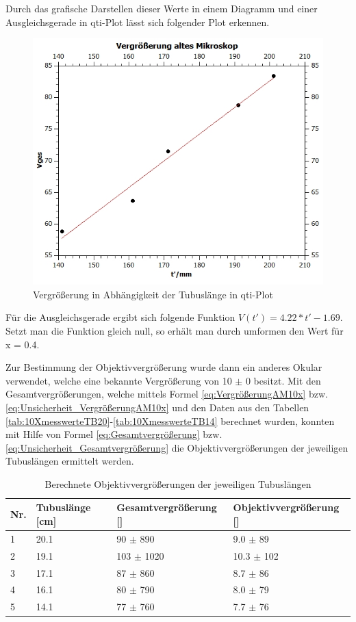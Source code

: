 \documentclass[12pt,a4paper,twoside]{article}
\begin{document}
\noindent
Durch das grafische Darstellen dieser Werte in einem Diagramm und einer Ausgleichsgerade in qti-Plot lässt sich folgender Plot erkennen.

\begin{figure}[H]
    \centering
    \includegraphics[width=0.6\linewidth, angle=0]{nudes/VergrößerungAltesMik.jpg}
    \caption{Vergrößerung in Abhängigkeit der Tubuslänge in qti-Plot}
    \label{fig:VergrößerungDiagramm}
\end{figure}

\noindent
Für die Ausgleichsgerade ergibt sich folgende Funktion $V(t') = 4.22*t' - 1.69$. Setzt man die Funktion gleich null, so erhält man durch umformen den Wert für x = 0.4. \newline

\noindent 
Zur Bestimmung der Objektivvergrößerung wurde dann ein anderes Okular verwendet, welche eine bekannte Vergrößerung von 10 $\pm$ 0 besitzt. 
Mit den Gesamtvergrößerungen, welche mittels Formel \ref{eq:VergrößerungAM10x} bzw. \ref{eq:Unsicherheit_VergrößerungAM10x} und den Daten aus den Tabellen \ref{tab:10XmesswerteTB20}-\ref{tab:10XmesswerteTB14} berechnet wurden, konnten mit Hilfe von Formel \ref*{eq:Gesamtvergrößerung} bzw. \ref{eq:Unsicherheit_Gesamtvergrößerung} die Objektivvergrößerungen der jeweiligen Tubuslängen ermittelt werden.

\begin{table}[H]
    \centering
    \caption{Berechnete Objektivvergrößerungen der jeweiligen Tubuslängen}
    \label{tab:Objektivvergrößerungen}
    \begin{tabular}{| l | l | l | l |}
        \hline
        Nr.   & Tubuslänge [cm]  & Gesamtvergrößerung [] & Objektivvergrößerung [] \\
        \hline
        1 & 20.1 & 90 $\pm$ 890 & 9.0 $\pm$ 89 \\
        2 & 19.1 & 103 $\pm$ 1020 & 10.3 $\pm$ 102 \\
        3 & 17.1 & 87 $\pm$ 860 & 8.7 $\pm$ 86 \\
        4 & 16.1 & 80 $\pm$ 790 & 8.0 $\pm$ 79 \\
        5 & 14.1 & 77 $\pm$ 760 & 7.7 $\pm$ 76 \\
        \hline
    \end{tabular}
\end{table}
\end{document}
